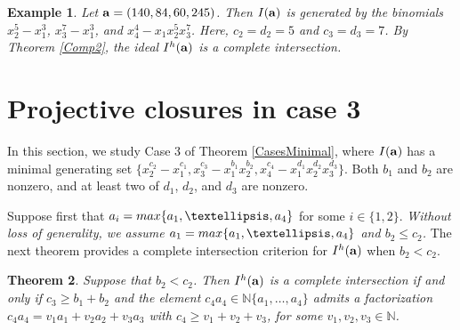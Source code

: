 \documentclass[10pt,a4paper]{amsart}
\newtheorem{thm1}{Theorem}[section]
\newtheorem{ex1}[thm1]{Example}
\begin{document}
\begin{ex1} {\rm Let ${\bf a}=(140, 84, 60, 245)$. Then $I({\bf a})$ is generated by the binomials $x_{2}^{5}-x_{1}^{3}$, $x_{3}^{7}-x_{1}^3$, and $x_{4}^4-x_1x_2^5x_3^7$. Here, $c_{2}=d_{2}=5$ and $c_{3}=d_{3}=7$. By Theorem \ref{Comp2}, the ideal $I^{h}({\bf a})$ is a complete intersection.}
\end{ex1}



\section{Projective closures in case 3}

In this section, we study Case 3 of Theorem \ref{CasesMinimal}, where $I({\bf a})$ has a minimal generating set $\{x_{2}^{c_2}-x_{1}^{c_1}, x_{3}^{c_3}-x_{1}^{b_1}x_{2}^{b_2}, x_{4}^{c_4}-x_{1}^{d_1}x_{2}^{d_2}x_{3}^{d_3}\}$. Both $b_1$ and $b_2$ are nonzero, and at least two of $d_1$, $d_2$, and $d_3$ are nonzero.

Suppose first that $a_{i}={\rm max}\{a_1,\ldots,a_4\}$ for some $i \in \{1,2\}$. {\em Without loss of generality, we assume $a_{1}={\rm max}\{a_1,\ldots,a_4\}$ and $b_2 \leq c_2$.} The next theorem provides a complete intersection criterion for $I^{h}({\bf a})$ when $b_2<c_2$.

\begin{thm1} \label{Basic5} Suppose that $b_2<c_2$. Then $I^{h}({\bf a})$ is a complete intersection if and only if $c_{3} \geq b_{1}+b_{2}$ and the element $c_{4}a_{4} \in \mathbb{N}\{a_1,\ldots,a_4\}$ admits a factorization $c_{4}a_{4}=v_{1}a_{1}+v_{2}a_{2}+v_{3}a_{3}$ with $c_{4} \geq v_1+v_{2}+v_{3}$, for some $v_1, v_2, v_3 \in \mathbb{N}$. 
\end{thm1}
\end{document}
